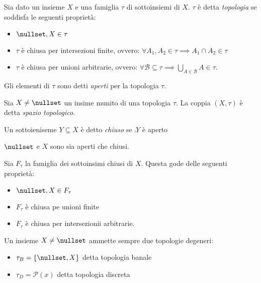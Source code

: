 


\begin{defn}[Topologia]
Sia dato un insieme $X$ e una famiglia $\tau$ di sottoinsiemi di $X$. $\tau$ è detta \textit{topologia} se soddisfa le seguenti proprietà:
\begin{itemize}
\item $\nullset,X\in\tau$ 
\item$\tau$ è chiusa per intersezioni finite, ovvero: $\forall A_1, A_2 \in \tau \implies A_1 \cap A_2 \in \tau$
\item $\tau$ è chiusa per unioni arbitrarie, ovvero: $\forall \mathcal B \subseteq \tau \implies \bigcup_{A\in\mathcal B} A \in \tau$.
\end{itemize}
Gli elementi di $\tau$ sono detti \textit{aperti} per la topologia $\tau$.
\end{defn}

\begin{defn}
Sia $X \neq \nullset$ un insime munito di una topologia $\tau$. La coppia $(X,\tau)$ è detta \textit{spazio topologico}.
\end{defn}
\begin{defn}[Chiuso]
Un sottoieniseme $Y \subseteq X$ è detto \textit{chiuso} se $\comp Y$ è aperto
\end{defn}

\begin{oss}
$\nullset$ e $X$ sono sia aperti che chiusi.
\end{oss}

\begin{prop}
Sia $F_\tau$ la famiglia dei sottoinsimi chiusi di $X$. Questa gode delle seguenti proprietà:
\begin{itemize}
\item $\nullset ,X \in F_\tau$ 
\item $F_\tau$ è chiusa pe unioni finite
\item $F_\tau$ è chiusa per intersezionii arbitrarie.
\end{itemize}
\end{prop}

\begin{oss}
Un insieme $X\neq\nullset$ ammette sempre due topologie degeneri:
\begin{itemize}
\item $\tau_B = \{\nullset,X\}$ detta topologia banale
\item $\tau_D = \mathcal P(x)$ detta topologia discreta
\end{itemize}
\end{oss}


